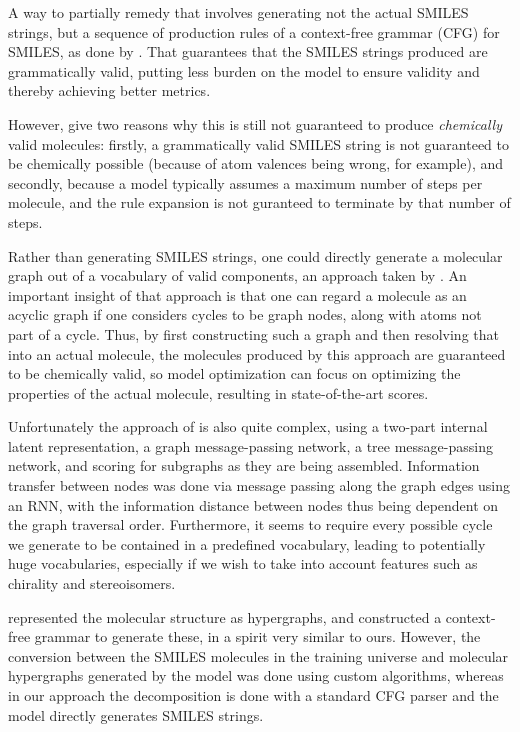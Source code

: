 \documentclass{article}
\begin{document}
A way to partially remedy that involves generating not the actual SMILES strings, but a sequence of production rules of a context-free grammar (CFG) for SMILES, as done by \cite{kusner17}. That guarantees that the SMILES strings produced are grammatically valid, putting less burden on the model to ensure validity and thereby achieving better metrics. 

However, \cite{kusner17} give two reasons why this is still not guaranteed to produce \emph{chemically} valid molecules: firstly, a grammatically valid SMILES string is not guaranteed to be chemically possible (because of atom valences being wrong, for example), and secondly, because a model typically assumes a maximum number of steps per molecule, and the rule expansion is not guranteed to terminate by that number of steps. 

Rather than generating SMILES strings, one could directly generate a molecular graph out of a vocabulary of valid components, an approach taken by \cite{jin18}. An important insight of that approach is that one can regard a molecule as an acyclic graph if one considers cycles to be graph nodes, along with atoms not part of a cycle. Thus, by first constructing such a graph and then resolving that into an actual molecule, the molecules produced by this approach are guaranteed to be chemically valid, so model optimization can focus on optimizing the properties of the actual molecule, resulting in state-of-the-art scores.

Unfortunately the approach of \cite{jin18} is also quite complex, using a two-part internal latent representation, a graph message-passing network, a tree message-passing network, and scoring for subgraphs as they are being assembled.  Information transfer between nodes was done via message passing along the graph edges using an RNN, with the information distance between nodes thus being dependent on the graph traversal order. Furthermore, it seems to require every possible cycle we generate to be contained in a predefined vocabulary, leading to potentially huge vocabularies, especially if we wish to take into account features such as chirality and stereoisomers.

\cite{kajino18} represented the molecular structure as hypergraphs, and constructed a context-free grammar to generate these, in a spirit very similar to ours. However, the conversion between the SMILES molecules in the training universe and molecular hypergraphs generated by the model was done using custom algorithms, whereas in our approach the decomposition is done with a standard CFG parser and the model directly generates SMILES strings.
\end{document}
